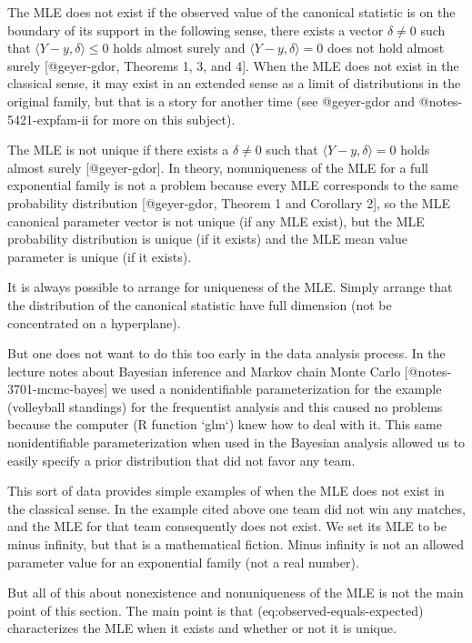\documentclass[11pt]{article}
\begin{document}
The MLE does not exist if the observed value of the canonical statistic is on
the boundary of its support in the following sense, there exists a vector
$\delta \neq 0$ such that $\langle Y - y, \delta \rangle \le 0$ holds
almost surely
and $\langle Y - y, \delta \rangle = 0$ does not hold almost surely
[@geyer-gdor, Theorems 1, 3, and 4].
When the MLE does not exist in the classical sense, it may exist in an
extended sense as a limit of distributions in the original family,
but that is a story for another time (see @geyer-gdor and
@notes-5421-expfam-ii for more on this subject).

The MLE is not unique if there exists a $\delta \neq 0$ such that
$\langle Y - y, \delta \rangle = 0$ holds almost surely
[@geyer-gdor].
In theory, nonuniqueness of the MLE for a full exponential family is not
a problem because every MLE corresponds to the same probability distribution
[@geyer-gdor, Theorem 1 and Corollary 2], so the MLE canonical
parameter vector is not unique (if any MLE exist),
but the MLE probability distribution is unique (if it exists)
and the MLE mean value parameter is unique (if it exists).

It is always possible to arrange for uniqueness of the MLE.
Simply arrange that the distribution of the canonical statistic have full
dimension (not be concentrated on a hyperplane).

But one does not want to do this too early in the data analysis process.
In the lecture notes about Bayesian inference and Markov chain Monte Carlo
[@notes-3701-mcmc-bayes] we used a nonidentifiable parameterization for
the example (volleyball standings) for the frequentist analysis and this
caused no problems because the computer (R function `glm`) knew how to deal
with it.  This same nonidentifiable parameterization when used in the
Bayesian analysis allowed us to easily specify a prior distribution that
did not favor any team.

This sort of data provides simple examples of when the MLE does not exist
in the classical sense.  In the example cited above one team did not win
any matches, and the MLE for that team consequently does not exist.
We set its MLE to be minus infinity, but that is a mathematical fiction.
Minus infinity is not an allowed parameter value for an exponential family
(not a real number).

But all of this about nonexistence and nonuniqueness of the MLE is not
the main point of this section.  The main point is
that \@ref(eq:observed-equals-expected) characterizes the MLE when it exists
and whether or not it is unique.
\end{document}
